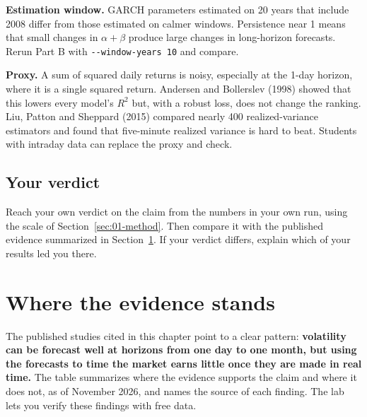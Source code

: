 \textbf{Estimation window.} GARCH parameters estimated on 20 years that include 2008 differ from those estimated on calmer windows. Persistence near 1 means that small changes in $\alpha + \beta$ produce large changes in long-horizon forecasts. Rerun Part B with \texttt{-{}-window-years 10} and compare.

\textbf{Proxy.} A sum of squared daily returns is noisy, especially at the 1-day horizon, where it is a single squared return. Andersen and Bollerslev (1998) showed that this lowers every model's $R^2$ but, with a robust loss, does not change the ranking. Liu, Patton and Sheppard (2015) compared nearly 400 realized-variance estimators and found that five-minute realized variance is hard to beat. Students with intraday data can replace the proxy and check.

\subsection*{Your verdict}

Reach your own verdict on the claim from the numbers in your own run, using the scale of Section~\ref{sec:01-method}. Then compare it with the published evidence summarized in Section~\ref{sec:10-verdict}. If your verdict differs, explain which of your results led you there.

\section{Where the evidence stands}
\label{sec:10-verdict}

The published studies cited in this chapter point to a clear pattern: \textbf{volatility can be forecast well at horizons from one day to one month, but using the forecasts to time the market earns little once they are made in real time.} The table summarizes where the evidence supports the claim and where it does not, as of November 2026, and names the source of each finding. The lab lets you verify these findings with free data.


